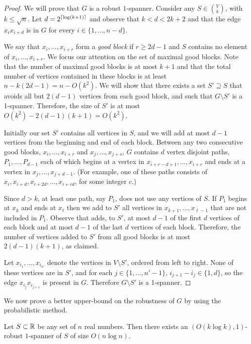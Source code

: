 \documentclass{patmorin}
\begin{document}
\begin{proof}
We will prove that $G$ is a robust $1$-spanner. Consider any
$S\in\binom{V}{k}$, with $k\le \sqrt{n}$.  Let $d=2^{{\lceil \log (k+1) \rceil}}$
and observe that $k < d < 2k+2$ and that the edge $x_ix_{i+d}$ is in $G$
for every $i\in\{1,\ldots,n-d\}$.

We say that $x_i,\ldots,x_{i+r}$ form a \emph{good block} if $r\ge
2d-1$ and $S$ contains no element of $x_i,\ldots,x_{i+r}$.  We focus
our attention on the set of maximal good blocks.  Note that the number
of maximal good blocks is at most $k+1$ and that the total number of
vertices contained in these blocks is at least $n-k(2d-1)=n-O(k^2)$.
We will show that there exists a set $S'\supseteq S$ that avoids all but
$2(d-1)$ vertices from each good block, and such that $G\setminus S'$
is a 1-spanner.
Therefore, the size of $S'$ is at most $O(k^2)-2(d-1)(k+1)=O(k^2)$.

Initially our set $S'$ contains all vertices in $S$, and
we will add at most $d-1$ vertices from the beginning and
end of each block.  Between any two consecutive good blocks,
$x_i,\ldots,x_{i+r}$ and $x_j,\ldots,x_{j+s}$, $G$ contains $d$
vertex disjoint paths, $P_1,\ldots,P_{d-1}$ each of which begins
at a vertex in $x_{i+r-d+1},\ldots,x_{i+r}$ and ends at a vertex in
$x_{j},\ldots,x_{j+d-1}$.  (For example, one of these paths consists of
$x_i,x_{i+d},x_{i+2d},\ldots,x_{i+cd}$, for some integer $c$.)

Since $d > k$, at least one path, say $P_1$, does not use any vertices
of $S$.  If $P_1$ begins at $x_k$ and ends at $x_\ell$ then we add
to $S'$ all vertices in 
$x_{k+1},\ldots,x_{\ell-1}$ that are not included in $P_1$.  Observe that adds,
to $S'$, at most $d-1$ of the first $d$ vertices of each block
and at most $d-1$ of the last $d$ vertices of each block.  Therefore,
the number of vertices added to $S'$ from all good blocks is at most
$2(d-1)(k+1)$, as claimed.

Let $x_{i_1},\ldots,x_{i_{n'}}$ denote the vertices in $V\setminus
S'$, ordered from left to right.  None of these vertices are in $S'$,
and for each $j\in\{1,\ldots,n'-1\}$, $i_{j+1}-i_{j}\in\{1,d\}$, so the
edge $x_{i_j}x_{i_{j+1}}$ is present in $G$.  Therefore $G\setminus S'$
is a 1-spanner.
\end{proof}

We now prove a better upper-bound on the robustness of $G$ by using the
probabilistic method.

\begin{thm}
Let $S\subset \mathbb{R}$ be any set of $n$ real numbers.  Then there exists an
$(O(k\log k),1)$-robust $1$-spanner of $S$ of size $O(n\log n)$.
\end{thm}
\end{document}
